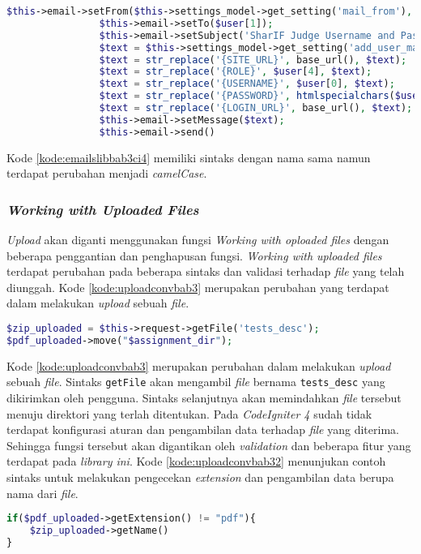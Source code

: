 \begin{lstlisting}[language=PHP, caption=Contoh perubahan \textit{library emails}, label=kode:emailslibbab3ci4]
$this->email->setFrom($this->settings_model->get_setting('mail_from'), $this->settings_model->get_setting('mail_from_name'));
				$this->email->setTo($user[1]);
				$this->email->setSubject('SharIF Judge Username and Password');
				$text = $this->settings_model->get_setting('add_user_mail');
				$text = str_replace('{SITE_URL}', base_url(), $text);
				$text = str_replace('{ROLE}', $user[4], $text);
				$text = str_replace('{USERNAME}', $user[0], $text);
				$text = str_replace('{PASSWORD}', htmlspecialchars($user[3]), $text);
				$text = str_replace('{LOGIN_URL}', base_url(), $text);
				$this->email->setMessage($text);
				$this->email->send()
\end{lstlisting}

Kode \ref{kode:emailslibbab3ci4} memiliki sintaks dengan nama sama namun terdapat perubahan menjadi \textit{camelCase}.

\subsubsection{\textit{Working with Uploaded Files}}
\textit{Upload} akan diganti menggunakan fungsi \textit{Working with oploaded files} dengan beberapa penggantian dan penghapusan fungsi. \textit{Working with uploaded files} terdapat perubahan pada beberapa sintaks dan validasi terhadap \textit{file} yang telah diunggah. Kode \ref{kode:uploadconvbab3} merupakan perubahan yang terdapat dalam melakukan \textit{upload} sebuah \textit{file}.

\begin{lstlisting}[language=PHP, caption=Contoh perubahan \textit{library upload}, label=kode:uploadconvbab3]
$zip_uploaded = $this->request->getFile('tests_desc');
$pdf_uploaded->move("$assignment_dir");
\end{lstlisting}

Kode \ref{kode:uploadconvbab3} merupakan perubahan dalam melakukan \textit{upload} sebuah \textit{file}. Sintaks \texttt{getFile} akan mengambil \textit{file} bernama \texttt{tests\_desc} yang dikirimkan oleh pengguna. Sintaks selanjutnya akan memindahkan \textit{file} tersebut menuju direktori yang terlah ditentukan. Pada \textit{CodeIgniter 4} sudah tidak terdapat konfigurasi aturan dan pengambilan data terhadap \textit{file} yang diterima. Sehingga fungsi tersebut akan digantikan oleh \textit{validation} dan beberapa fitur yang terdapat pada \textit{library ini}. Kode \ref{kode:uploadconvbab32} menunjukan contoh sintaks untuk melakukan pengecekan \textit{extension} dan pengambilan data berupa nama dari \textit{file}.
\begin{lstlisting}[language=PHP, caption=Contoh sintaks untuk mengambil \textit{extension} dan data \textit{file}, label=kode:uploadconvbab32]
if($pdf_uploaded->getExtension() != "pdf"){
	$zip_uploaded->getName()
}
\end{lstlisting}

